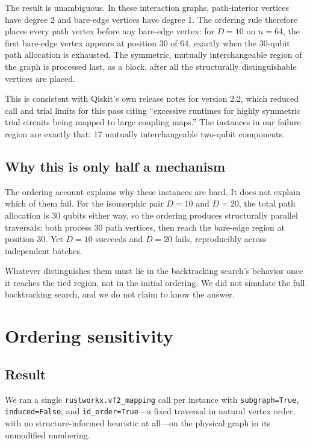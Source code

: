 \documentclass[11pt]{article}
\begin{document}
The result is unambiguous. In these interaction graphs, path-interior
vertices have degree 2 and bare-edge vertices have degree 1. The
ordering rule therefore places every path vertex before any bare-edge
vertex: for $D=10$ on $n=64$, the first bare-edge vertex appears at
position 30 of 64, exactly when the 30-qubit path allocation is
exhausted. The symmetric, mutually interchangeable region of the graph
is processed last, as a block, after all the structurally
distinguishable vertices are placed.

This is consistent with Qiskit's own release notes for version 2.2,
which reduced call and trial limits for this pass citing ``excessive
runtimes for highly symmetric trial circuits being mapped to large
coupling maps.'' The instances in our failure region are exactly that:
17 mutually interchangeable two-qubit components.

\subsection{Why this is only half a mechanism}

The ordering account explains why these instances are hard. It does not
explain which of them fail. For the isomorphic pair $D=10$ and $D=20$,
the total path allocation is 30 qubits either way, so the ordering
produces structurally parallel traversals: both process 30 path
vertices, then reach the bare-edge region at position 30. Yet $D=10$
succeeds and $D=20$ fails, reproducibly across independent batches.

Whatever distinguishes them must lie in the backtracking search's
behavior once it reaches the tied region, not in the initial ordering.
We did not simulate the full backtracking search, and we do not claim
to know the answer.

\section{Ordering sensitivity}
\label{sec:ordering}

\subsection{Result}

We ran a single \texttt{rustworkx.vf2\_mapping} call per instance with
\texttt{subgraph=True}, \texttt{induced=False}, and
\texttt{id\_order=True}---a fixed traversal in natural vertex order, with
no structure-informed heuristic at all---on the physical graph in its
unmodified numbering.
\end{document}
